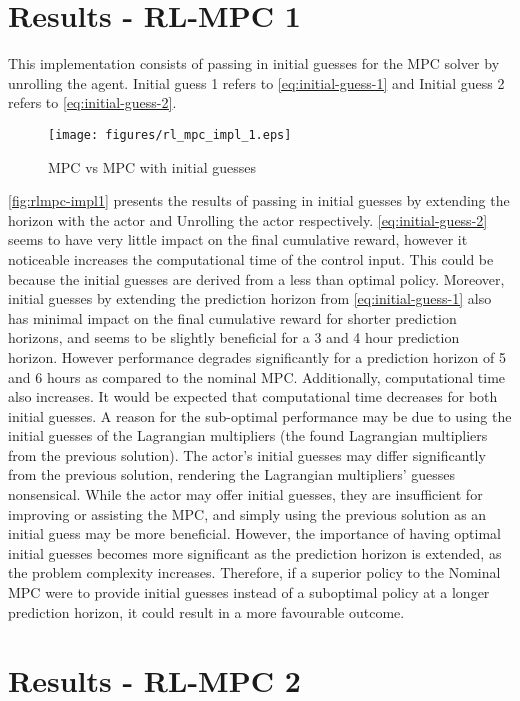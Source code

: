 \section{Results - RL-MPC 1}
This implementation consists of passing in initial guesses for the MPC solver by unrolling the agent. Initial guess 1 refers to \autoref{eq:initial-guess-1} and Initial guess 2 refers to \autoref{eq:initial-guess-2}.
\begin{figure}[H]
	\centering
	\texttt{[image: figures/rl\_mpc\_impl\_1.eps]}
	\caption{MPC vs MPC with initial guesses}
	\label{fig:rlmpc-impl1}
\end{figure}

\autoref{fig:rlmpc-impl1} presents the results of passing in initial guesses by extending the horizon with the actor and Unrolling the actor respectively. \autoref{eq:initial-guess-2} seems to have very little impact on the final cumulative reward, however it noticeable increases the computational time of the control input. This could be because the initial guesses are derived from a less than optimal policy. Moreover, initial guesses by extending the prediction horizon from \autoref{eq:initial-guess-1} also has minimal impact on the final cumulative reward for shorter prediction horizons, and seems to be slightly beneficial for a 3 and 4 hour prediction horizon. However performance degrades significantly for a prediction horizon of 5 and 6 hours as compared to the nominal MPC. Additionally, computational time also increases. It would be expected that computational time decreases for both initial guesses. A reason for the sub-optimal performance may be due to using the initial guesses of the Lagrangian multipliers (the found Lagrangian multipliers from the previous solution). The actor's initial guesses may differ significantly from the previous solution, rendering the Lagrangian multipliers' guesses nonsensical. While the actor may offer initial guesses, they are insufficient for improving or assisting the MPC, and simply using the previous solution as an initial guess may be more beneficial. However, the importance of having optimal initial guesses becomes more significant as the prediction horizon is extended, as the problem complexity increases. Therefore, if a superior policy to the Nominal MPC were to provide initial guesses instead of a suboptimal policy at a longer prediction horizon, it could result in a more favourable outcome.

\section{Results - RL-MPC 2}

